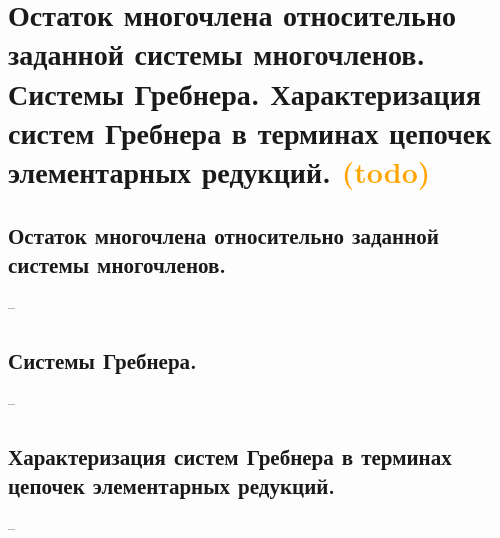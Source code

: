 \section{Остаток многочлена относительно заданной системы многочленов. Системы Гребнера. Характеризация систем Гребнера в терминах цепочек элементарных редукций. \textcolor{orange}{(todo)}}

\subsection{Остаток многочлена относительно заданной системы многочленов.}
--

\subsection{Системы Гребнера.}
--

\subsection{Характеризация систем Гребнера в терминах цепочек элементарных редукций.}
--